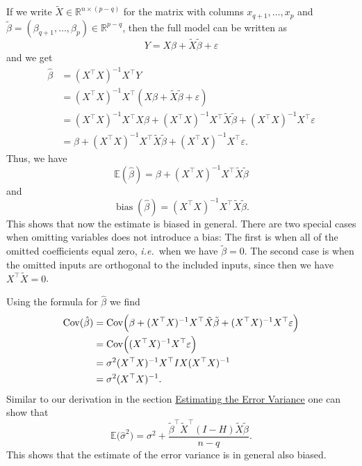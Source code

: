 \documentclass[
  a4paper,
]{article}
\theoremstyle{definition}
\theoremstyle{definition}
\theoremstyle{definition}
\theoremstyle{definition}
\theoremstyle{remark}
\begin{document}
If we write \(\tilde X \in \mathbb{R}^{n\times (p-q)}\) for the matrix with columns
\(x_{q+1}, \ldots, x_p\) and \(\tilde\beta = (\beta_{q+1}, \ldots, \beta_p) \in \mathbb{R}^{p-q}\), then the full model can be written as
\begin{equation*}
  Y
  = X \beta + \tilde X \tilde\beta + \varepsilon
\end{equation*}
and we get
\begin{align*}
  \hat\beta
  &= (X^\top X)^{-1} X^\top Y \\
  &= (X^\top X)^{-1} X^\top (X \beta + \tilde X \tilde\beta + \varepsilon) \\
  &= (X^\top X)^{-1} X^\top X \beta + (X^\top X)^{-1} X^\top \tilde X \tilde\beta + (X^\top X)^{-1} X^\top \varepsilon\\
  &= \beta + (X^\top X)^{-1} X^\top \tilde X \tilde\beta + (X^\top X)^{-1} X^\top \varepsilon.
\end{align*}
Thus, we have
\begin{equation*}
  \mathbb{E}(\hat\beta)
  = \beta + (X^\top X)^{-1} X^\top \tilde X \tilde\beta
\end{equation*}
and
\begin{equation*}
  \mathop{\mathrm{bias}}(\hat\beta)
  = (X^\top X)^{-1} X^\top \tilde X \tilde\beta.
\end{equation*}
This shows that now the estimate is biased in general. There are two
special cases when omitting variables does not introduce a bias:
The first is when all of the omitted coefficients equal zero, \emph{i.e.}~when
we have \(\tilde\beta = 0\). The second case is when the omitted inputs are
orthogonal to the included inputs, since then we have \(X^\top \tilde X = 0\).

Using the formula for \(\hat\beta\) we find
\begin{align*}
  \mathop{\mathrm{Cov}}( \hat\beta )
  &= \mathop{\mathrm{Cov}}\Bigl( \beta + (X^\top X)^{-1} X^\top \tilde X \tilde\beta + (X^\top X)^{-1} X^\top \varepsilon\Bigr) \\
  &= \mathop{\mathrm{Cov}}\Bigl( (X^\top X)^{-1} X^\top \varepsilon\Bigr) \\
  &= \sigma^2 (X^\top X)^{-1} X^\top I X (X^\top X)^{-1} \\
  &= \sigma^2 (X^\top X)^{-1}.
\end{align*}
Similar to our derivation in the section \protect\hyperlink{var-est-bias}{Estimating the Error Variance}
one can show that
\begin{equation*}
  \mathbb{E}\bigl( \hat\sigma^2 \bigr)
  = \sigma^2 + \frac{\tilde\beta^\top \tilde X^\top (I - H) \tilde X \tilde \beta}{n-q}.
\end{equation*}
This shows that the estimate of the error variance is in general also biased.
\end{document}
